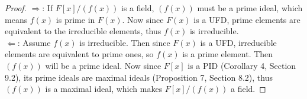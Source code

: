\documentclass{article}
\begin{document}
  \begin{proof}
    $\Rightarrow$: If $F[x]/(f(x))$ is a field, $(f(x))$ must be a prime
    ideal, which means $f(x)$ is prime in $F(x)$. Now  since $F(x)$ is a
    UFD, prime elements are equivalent to the irreducible elements, thus
    $f(x)$ is irreducible. \\

    $\Leftarrow$: Assume $f(x)$ is irreducible. Then since $F(x)$ is a UFD,
    irreducible elements are equivalent to prime ones, so $f(x)$ is a prime
    element. Then $(f(x))$ will be a prime ideal. Now since $F[x]$ is a PID
    (Corollary 4, Section 9.2), its prime ideals are maximal ideals
    (Proposition 7, Section 8.2), thus $(f(x))$ is a maximal ideal, which
    makes $F[x]/(f(x))$ a field.
  \end{proof}
\end{document}
